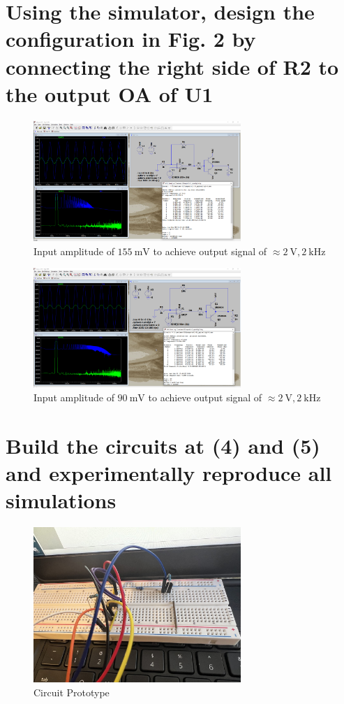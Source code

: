 \documentclass{article}
\begin{document}
	
	\section{Using the simulator, design the configuration in Fig. 2 by connecting the right side of R2 to the output OA of U1}
	
	\begin{figure}[H]
	    \centering
	    \includegraphics[width=0.7\textwidth]{4ab}
	    \caption{Input amplitude of $\SI{155}{\milli\volt}$ to achieve output signal of $\approx \SI{2}{\volt}, \SI{2}{\kilo\hertz}$}
	\end{figure}
	
	\begin{figure}[H]
	    \centering
	    \includegraphics[width=0.7\textwidth]{5ab}
	    \caption{Input amplitude of $\SI{90}{\milli\volt}$ to achieve output signal of $\approx \SI{2}{\volt}, \SI{2}{\kilo\hertz}$}
	\end{figure}
	
	\section{Build the circuits at (4) and (5) and experimentally reproduce all simulations}
	
	\begin{figure}[H]
	    \centering
	    \includegraphics[width=0.7\textwidth]{photo-3}
	    \caption{Circuit Prototype}
	\end{figure}
	
\end{document}

